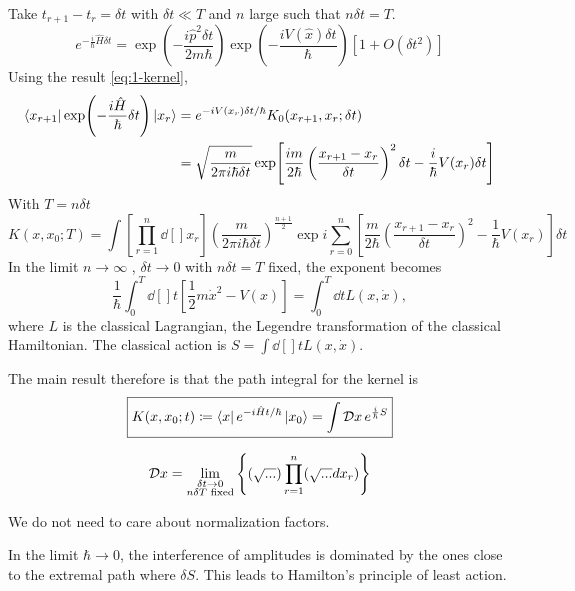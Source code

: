 Take $t_{r+1} -t_r = \delta t$  with $\delta t \ll T$  and $n$ large such that $n \delta t = T$.
 \begin{equation}
   e^{-\frac{i}{\hbar} \hat{H} \delta t} = \exp(-\frac{i \hat{p}^2 \delta t}{2 m \hbar}) \exp(-\frac{i V(\hat{x}) \delta t}{\hbar}) [1 + O(\delta t^2)]
\end{equation}
Using the result \eqref{eq:1-kernel}, 
\begin{align}
  \bra{x_{r +1}} \exp(- \frac{i \hat{H}}{\hbar} \delta t)\ket{x_r} &= e^{-i V(x_r) \delta t / \hbar} K_0 (x_{r+1}, x_r ; \delta t) \\
  &= \sqrt{\frac{m}{2 \pi i \hbar \delta t}} \exp[\frac{i m}{2 \hbar} \left( \frac{x_{r+1} - x_r}{\delta t} \right)^2 \delta t - \frac{i}{\hbar} V(x_r) \delta t]
\end{align}
With $T = n \delta t$
 \begin{equation}
   K(x, x_0; T) = \int \left[ \prod_{r = 1}^n \dd[]{x_r} \right] \left( \frac{m}{2 \pi i \hbar \delta t} \right)^{\frac{n + 1}{2}} \exp{i \sum_{r = 0}^n \left[ \frac{m}{2 \hbar}\left( \frac{x_{r + 1} - x_r}{\delta t} \right)^2 - \frac{1}{\hbar} V(x_r) \right] \delta t}
\end{equation}
In the limit $n \to \infty$ , $\delta t \to 0$ with  $n \delta t = T$  fixed, the exponent becomes
\begin{equation}
  \frac{1}{\hbar}\int_0^T \dd[]{t} \left[ \frac{1}{2} m \dot{x}^2 - V(x) \right] = \int_0^T \dd{t} L(x, \dot{x}),
\end{equation}
where $L$  is the classical Lagrangian, the Legendre transformation of the classical Hamiltonian.
The classical action is $S = \int \dd[]{t} L(x, \dot{x})$.

The main result therefore is that the path integral for the kernel is
\begin{equation}
  \boxed{K(x, x_0; t) \coloneqq \bra{x}e^{-i \hat{H} t / \hbar} \ket{x_0} = \int \mathop{\mathcal{D} x} e^{\frac{i}{\hbar} S}}
\end{equation}

\begin{definition}
  \begin{equation}
    \mathop{\mathcal{D} x} = \lim_{\substack{\delta t \to 0 \\ n \delta T \text{ fixed}}} \left\{ (\sqrt{...}) \prod_{r = 1}^n (\sqrt{...} d x_r) \right\}
  \end{equation}
\end{definition}
We do not need to care about normalization factors.

\begin{remark}
  In the limit $\hbar \to 0$, the interference of amplitudes is dominated by the ones close to the extremal path where $\delta S$. This leads to Hamilton's principle of least action.
\end{remark}
